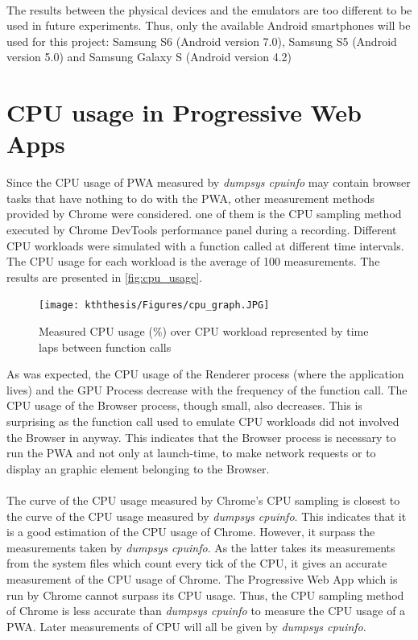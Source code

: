\documentclass{kththesis}
\begin{document}
\paragraph{}
The results between the physical devices and the emulators are too different to be used in future experiments. Thus, only the available Android smartphones will be used for this project: Samsung S6 (Android version 7.0), Samsung S5 (Android version 5.0) and Samsung Galaxy S (Android version 4.2)


\section{CPU usage in Progressive Web Apps}
\label{results:cpu}
Since the CPU usage of PWA measured by \textit{dumpsys cpuinfo} may contain browser tasks that have nothing to do with the PWA, other measurement methods provided by Chrome were considered. one of them is the CPU sampling method executed by Chrome DevTools performance panel during a recording. 
Different CPU workloads were simulated with a function called at different time intervals. The CPU usage for each workload is the average of 100 measurements. The results are presented in \autoref{fig:cpu_usage}.

\begin{figure}
    \centering
    \texttt{[image: kththesis/Figures/cpu\_graph.JPG]}
    \caption[Measurements of CPU Usage of PWA]{Measured CPU usage (\%) over CPU workload represented by time laps between function calls}
    \label{fig:cpu_usage}
\end{figure}

As was expected, the CPU usage of the Renderer process (where the application lives) and the GPU Process decrease with the frequency of the function call. The CPU usage of the Browser process, though small, also decreases. This is surprising as the function call used to emulate CPU workloads did not involved the Browser in anyway. This indicates that the Browser process is necessary to run the PWA and not only at launch-time, to make network requests or to display an graphic element belonging to the Browser.

\paragraph{}
The curve of the CPU usage measured by Chrome's CPU sampling is closest to the curve of the CPU usage measured by \textit{dumpsys cpuinfo}. This indicates that it is a good estimation of the CPU usage of Chrome. However, it surpass the measurements taken by \textit{dumpsys cpuinfo}. As the latter takes its measurements from the system files which count every tick of the CPU, it gives an accurate measurement of the CPU usage of Chrome. The Progressive Web App which is run by Chrome cannot surpass its CPU usage. Thus, the CPU sampling method of Chrome is less accurate than \textit{dumpsys cpuinfo} to measure the CPU usage of a PWA. Later measurements of CPU will all be given by \textit{dumpsys cpuinfo}.
\end{document}
